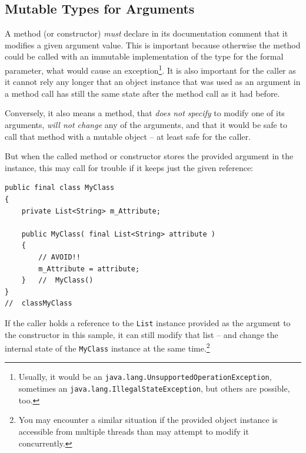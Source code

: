
\subsection{Mutable Types for Arguments}\label{sec:MutableTypesForArguments}
A method (or constructor) \textit{must} declare in its documentation comment that it modifies a given argument value. This is important because otherwise the method could be called with an immutable implementation of the type for the formal parameter, what would cause an exception\footnote{Usually, it would be an \lstinline|java.lang.UnsupportedOperationException|\autocite{ORACLE_DOC_UNSUPPORTEDOPERATIONEXCEPTION_CLASS}, sometimes an \lstinline|java.lang.IllegalStateException|\autocite{ORACLE_DOC_ILLEGALSTATEEXCEPTION_CLASS}, but others are possible, too.}. It is also important for the caller as it cannot rely any longer that an object instance that was used as an argument in a method call has still the same state after the method call as it had before.

Conversely, it also means a method, that \textit{does not specify} to modify one of its arguments, \textit{will not change} any of the arguments, and that it would be safe to call that method with a mutable object – at least safe for the caller.

But when the called method or constructor stores the provided argument in the instance, this may call for trouble if it keeps just the given reference:
\begin{lstlisting}
public final class MyClass
{
    private List<String> m_Attribute;
    
    public MyClass( final List<String> attribute )
    {
        // AVOID!!
        m_Attribute = attribute;
    }   //  MyClass()
}
//  classMyClass
\end{lstlisting}

If the caller holds a reference to the \lstinline|List| instance provided as the argument to the constructor in this sample, it can still modify that list – and change the internal state of the \lstinline|MyClass| instance at the same time.\footnote{You may encounter a similar situation if the provided object instance is accessible from multiple threads than may attempt to modify it concurrently.}

